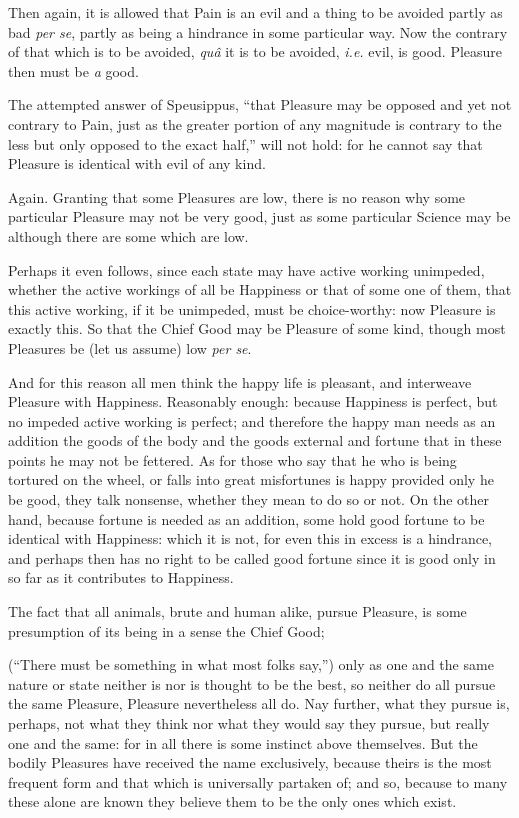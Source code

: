 Then again, it is allowed that Pain is an evil and a thing to be avoided partly
as bad \emph{per se}, partly as being a hindrance in some particular way. Now
the contrary of that which is to be avoided, \emph{quâ} it is to be avoided,
\emph{i.e.} evil, is good. Pleasure then must be \emph{a} good.

The attempted answer of Speusippus, “that Pleasure may be opposed and yet
not contrary to Pain, just as the greater portion of any magnitude is contrary
to the less but only opposed to the exact half,” will not hold: for he
cannot say that Pleasure is identical with evil of any kind.

Again. Granting that some Pleasures are low, there is no reason why some
particular Pleasure may not be very good, just as some particular Science may
be although there are some which are low.

Perhaps it even follows, since each state may have active working unimpeded,
whether the active workings of all be Happiness or that of some one of them,
that this active working, if it be unimpeded, must be choice-worthy: now
Pleasure is exactly this. So that the Chief Good may be Pleasure of some kind,
though most Pleasures be (let us assume) low \emph{per se}.

And for this reason all men think the happy life is pleasant, and interweave
Pleasure with Happiness. Reasonably enough: because Happiness is perfect, but
no impeded active working is perfect; and therefore the happy man needs as an
addition the goods of the body and the goods external and fortune that in these
points he may not be fettered. As for those who say that he who is being
tortured on the wheel, or falls into great misfortunes is happy provided only
he be good, they talk nonsense, whether they mean to do so or not. On the other
hand, because fortune is needed as an addition, some hold good fortune to be
identical with Happiness: which it is not, for even this in excess is a
hindrance, and perhaps then has no right to be called good fortune since it is
good only in so far as it contributes to Happiness.

The fact that all animals, brute and human alike, pursue Pleasure, is some
presumption of its being in a sense the Chief Good;

(“There must be something in what most folks say,”) only as one and
the same nature or state neither is nor is thought to be the best, so neither
do all pursue the same Pleasure, Pleasure nevertheless all do. Nay further,
what they pursue is, perhaps, not what they think nor what they would say they
pursue, but really one and the same: for in all there is some instinct above
themselves. But the bodily Pleasures have received the name exclusively,
because theirs is the most frequent form and that which is universally partaken
of; and so, because to many these alone are known they believe them to be the
only ones which exist.

